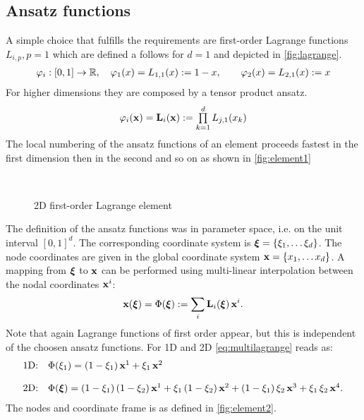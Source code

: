 \subsection{Ansatz functions}
A simple choice that fulfills the requirements are first-order Lagrange functions $L_{i,p},p=1$ which are defined a follows for $d=1$ and depicted in \cref{fig:lagrange}.
\begin{equation}
  \begin{array}{ll}
    \varphi_i: [0,1] \to \mathbb{R},\quad
    \varphi_1(x) = L_{1,1}(x) := 1-x, \qquad \varphi_2(x) = L_{2,1}(x) := x
  \end{array}
\end{equation}
For higher dimensions they are composed by a tensor product ansatz.
\begin{equation}
  \begin{array}{ll}
    \varphi_i(\textbf{x}) = \textbf{L}_{i}(\textbf{x}) := \prod\limits_{k=1}^{d} L_{j,1}(x_k)
  \end{array}
\end{equation}
The local numbering of the ansatz functions of an element proceeds fastest in the first dimension then in the second and so on as shown in \cref{fig:element1}

\begin{figure}
  \centering
  \,
  \,
  \caption{2D first-order Lagrange element}
  \label{fig:2d-lagrange}
\end{figure}

The definition of the ansatz functions was in parameter space, i.e. on the unit interval $[0,1]^d$. The corresponding coordinate system is $\boldsymbol{\xi} = \{\xi_1, \dots \xi_d\}$. The node coordinates are given in the global coordinate system $\textbf{x} = \{x_1, \dots x_d\}$. A mapping from $\boldsymbol{\xi}$ to $\textbf{x}$ can be performed using multi-linear interpolation between the nodal coordinates $\textbf{x}^i$:
\begin{equation}\label{eq:multilagrange}
  \begin{array}{ll}
    \textbf{x}(\boldsymbol{\xi}) = \Phi(\boldsymbol{\xi}) := \displaystyle\sum\limits_{i} \textbf{L}_i(\boldsymbol{\xi})\,\textbf{x}^i.
  \end{array}
\end{equation}
Note that again Lagrange functions of first order appear, but this is independent of the choosen ansatz functions. For 1D and 2D  \eqref{eq:multilagrange}  reads as:
\begin{equation}\label{eq:fe_phi}
  \begin{array}{ll}
    \text{1D:}\quad
    \Phi(\xi_1) = (1-\xi_1)\,\textbf{x}^1 + \xi_1\,\textbf{x}^2\\[4mm]
    \text{2D:}\quad
    \Phi(\boldsymbol{\xi}) = (1-\xi_1)\,(1-\xi_2)\,\textbf{x}^1 + \xi_1\,(1-\xi_2)\,\textbf{x}^2 + (1-\xi_1)\,\xi_2\,\textbf{x}^3 + \xi_1\,\xi_2\,\textbf{x}^4.
  \end{array}
\end{equation}
The nodes and coordinate frame is as defined in \cref{fig:element2}.


